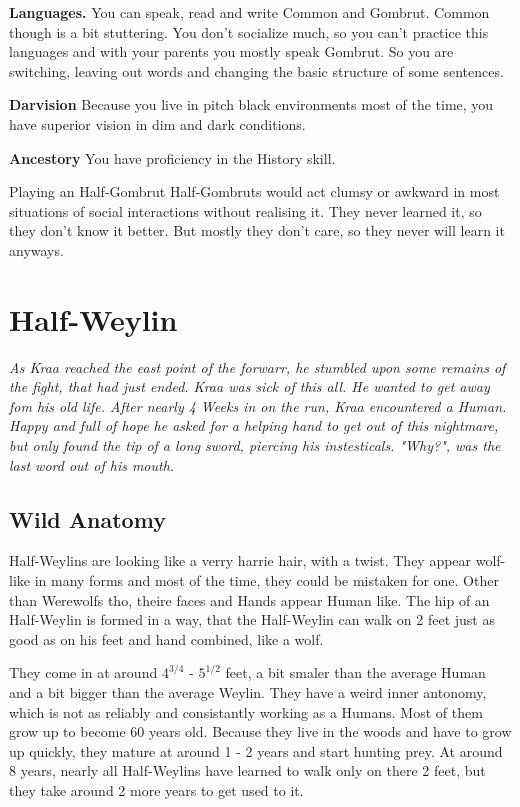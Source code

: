 \documentclass[10pt,twoside,twocolumn,openany]{book}
\begin{document}
\textbf{Languages.} You can speak, read and write Common and Gombrut. Common though is a bit stuttering. You don't socialize much, so you can't practice this languages and with your parents you mostly speak Gombrut. So you are switching, leaving out words and changing the basic structure of some sentences.

\textbf{Darvision} Because you live in pitch black environments most of the time, you have superior vision in dim and dark conditions. 

\textbf{Ancestory} You have proficiency in the History skill.

\begin{commentbox}{Playing an Half-Gombrut}
Half-Gombruts would act clumsy or awkward in most situations of social interactions without realising it. They never learned it, so they don't know it better. But mostly they don't care, so they never will learn it anyways.
\end{commentbox}

\newpage\mbox{}
\newpage
\section{Half-Weylin}

\textit{As Kraa reached the east point of the forwarr, he stumbled upon some remains of the fight, that had just ended. Kraa was sick of this all. He wanted to get away fom his old life. After nearly 4 Weeks in on the run, Kraa encountered a Human. Happy and full of hope he asked for a helping hand to get out of this nightmare, but only found the tip of a long sword, piercing his instesticals. "Why?", was the last word out of his mouth.}

\subsection{Wild Anatomy}
Half-Weylins are looking like a verry harrie hair, with a twist. They appear wolf-like in many forms and most of the time, they could  be mistaken for one. Other than Werewolfs tho, theire faces and Hands appear Human like. The hip of an Half-Weylin is formed in a way, that the Half-Weylin can walk on 2 feet just as good as on his feet and hand combined, like a wolf.

They come in at around $4^{3/4}$ - $5^{1/2}$ feet, a bit smaler than the average Human and a bit bigger than the average Weylin. They have a weird inner antonomy, which is not as reliably and consistantly working as a Humans. Most of them grow up to become 60 years old. Because they live in the woods and have to grow up quickly, they mature at around 1 - 2 years and start hunting prey. At around 8 years, nearly all Half-Weylins have learned to walk only on there 2 feet, but they take around 2 more years to get used to it.
\end{document}
